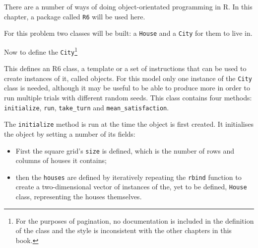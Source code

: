 There are a number of ways of doing object-orientated programming in R.
In this chapter, a package called \texttt{R6} will be used here.

For this problem two classes will be built: a
\texttt{House} and a \texttt{City} for them to live in.

Now to define the \texttt{City}\footnote{
For the purposes of pagination, no documentation is included in the definition
of the class and the style is inconsistent with the other chapters in this book.
}


This defines an R6 class, a template or a set of instructions that can be used
to create instances of it, called objects.
For this model only one instance of the \texttt{City} class is needed,
although it may be useful to be able to produce more in order to run multiple
trials with different random seeds.
This class contains four methods: \texttt{initialize},
\texttt{run}, \texttt{take_turn} and
\texttt{mean_satisfaction}.

The \texttt{initialize} method is run at the time the object is first
created.
It initialises the object by setting a number of its fields:

\begin{itemize}
     \item First the square grid's \texttt{size} is defined, which
           is the number of rows and columns of houses it contains;
     \item then the \texttt{houses} are defined by iteratively repeating
           the \texttt{rbind} function to create a two-dimensional vector
           of instances of the, yet to be defined, \texttt{House} class,
           representing the houses themselves.
\end{itemize}

